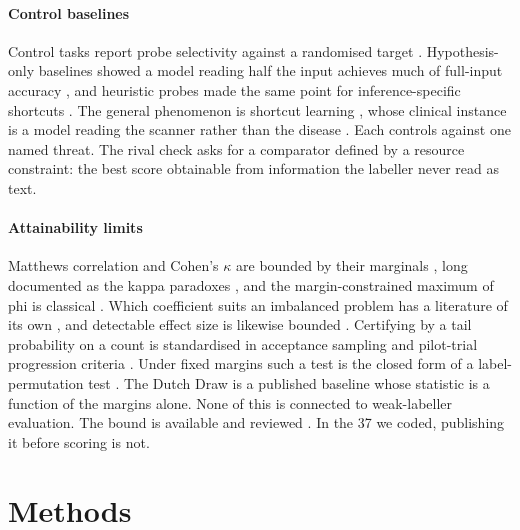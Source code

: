 \documentclass[review]{elsarticle}
\begin{document}
\paragraph{Control baselines}
Control tasks report probe selectivity against a randomised target
\cite{hewitt2019control,belinkov2022probing}. Hypothesis-only baselines showed a
model reading half the input achieves much of full-input accuracy
\cite{poliak2018hypothesis,gururangan2018artifacts}, and heuristic probes made
the same point for inference-specific shortcuts \cite{mccoy2019hans}. The general
phenomenon is shortcut learning \cite{geirhos2020shortcut}, whose clinical instance is a model reading the scanner rather than the disease
\cite{zech2018generalization,kaufman2012leakage}. Each controls against one named threat. The rival
check asks for a comparator defined by a resource constraint: the best score
obtainable from information the labeller never read as text.

\paragraph{Attainability limits}
Matthews correlation and Cohen's $\kappa$ are bounded by their marginals
\cite{matthews1975mcc,cohen1960kappa}, long documented as the kappa paradoxes
\cite{feinstein1990paradoxes,cicchetti1990resolving,byrt1993pabak}, and the
margin-constrained maximum of phi is classical
\cite{cureton1959phimax,guilford1965phi}. Which coefficient suits an imbalanced
problem has a literature of its own
\cite{chicco2020mcc,chicco2021mccbalanced,saito2015prcurve,delgado2019kappa},
and detectable effect size is likewise bounded \cite{hanley1982meaning}. Certifying by a tail probability on a count is
standardised in acceptance sampling \cite{dodge1929sampling} and pilot-trial
progression criteria \cite{lewis2021progression}. Under fixed margins such a
test is the closed form of a label-permutation test
\cite{ojala2009permutation,combrisson2015chance}. The Dutch Draw
\cite{vandebijl2024dutchdraw,pries2023optimalbaseline} is a published baseline
whose statistic is a function of the margins alone. None of this is connected to
weak-labeller evaluation. The
bound is available and reviewed \cite{umesh1989kappamax,davenport1991phiphimax}.
In the 37 we coded, publishing it before scoring is not.

\section{Methods}
\label{sec:method}
\end{document}
